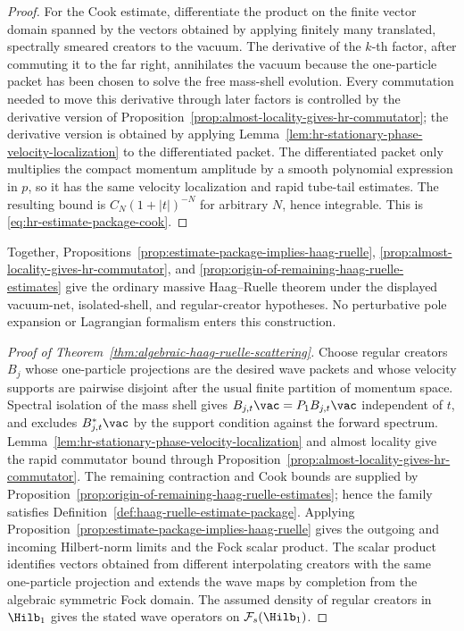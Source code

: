 \begin{proof}
For the Cook estimate, differentiate the product on the finite vector domain
spanned by the vectors obtained by applying finitely many translated,
spectrally smeared creators to the vacuum.
The derivative of the \(k\)-th factor, after commuting it to the far right,
annihilates the vacuum because the one-particle packet has been chosen to
solve the free mass-shell evolution.  Every commutation needed to move this
derivative through later factors is controlled by the derivative version of
Proposition~\ref{prop:almost-locality-gives-hr-commutator}; the derivative
version is obtained by applying
Lemma~\ref{lem:hr-stationary-phase-velocity-localization} to the differentiated
packet.  The differentiated packet only multiplies the compact momentum
amplitude by a smooth polynomial expression in \(p\), so it has the same
velocity localization and rapid tube-tail estimates.
The resulting bound is \(C_N(1+|t|)^{-N}\) for arbitrary \(N\), hence
integrable.  This is \eqref{eq:hr-estimate-package-cook}.
\end{proof}

Together,
Propositions~\ref{prop:estimate-package-implies-haag-ruelle},
\ref{prop:almost-locality-gives-hr-commutator}, and
\ref{prop:origin-of-remaining-haag-ruelle-estimates} give the ordinary
massive Haag--Ruelle theorem under the displayed vacuum-net, isolated-shell,
and regular-creator hypotheses.  No perturbative pole expansion or
Lagrangian formalism enters this construction.

\begin{proof}[Proof of Theorem~\ref{thm:algebraic-haag-ruelle-scattering}]
Choose regular creators \(B_j\) whose one-particle projections are the desired
wave packets and whose velocity supports are pairwise disjoint after the usual
finite partition of momentum space.  Spectral isolation of the mass shell gives
\(B_{j,t}\vac=P_1B_{j,t}\vac\) independent of \(t\), and excludes
\(B_{j,t}^*\vac\) by the support condition against the forward spectrum.
Lemma~\ref{lem:hr-stationary-phase-velocity-localization} and almost locality
give the rapid commutator bound through
Proposition~\ref{prop:almost-locality-gives-hr-commutator}.  The remaining
contraction and Cook bounds are supplied by
Proposition~\ref{prop:origin-of-remaining-haag-ruelle-estimates}; hence the
family satisfies Definition~\ref{def:haag-ruelle-estimate-package}.  Applying
Proposition~\ref{prop:estimate-package-implies-haag-ruelle} gives the outgoing
and incoming Hilbert-norm limits and the Fock scalar product.  The scalar
product identifies vectors obtained from different interpolating creators with
the same one-particle projection and extends the wave maps by completion from
the algebraic symmetric Fock domain.  The assumed density of regular creators
in \(\Hilb_1\) gives the stated wave operators on
\(\mathcal F_s(\Hilb_1)\).
\end{proof}

